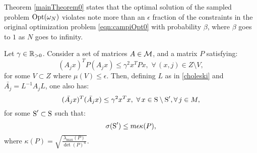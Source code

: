 Theorem \ref{mainTheorem0} states that the optimal solution of the sampled problem $\text{Opt}(\omega_N)$ violates note more than an $\epsilon$ fraction of the constraints in the original optimization problem  \eqref{eqn:campiOpt0} with probability $\beta$, where $\beta$ goes to $1$ as $N$ goes to infinity.


\begin{theorem}\label{thm:mainTheorem01}Let $\gamma \in \mathbb{R}_{> 0}$. Consider a set of matrices $A \in \mathcal{M}$, and a matrix $P$ satisfying:
\begin{equation}\label{eqn:P}(A_j x)^TP(A_j x) \leq {\gamma}^2x^TPx,\,\, \forall\, (x, j) \in Z \setminus V,\end{equation}
for some $V \subset Z$ where $\mu(V) \leq \epsilon$. Then, defining $L$ as in \eqref{choleski} and $\bar{A_j}=  L^{-1}A_jL$, one also has:
\begin{equation*}\label{eqn:thm01-2}(\bar{A_j} x)^T(\bar{A_j} x) \leq {\gamma}^2x^Tx,\,\, \forall\, x \in \text{S} \setminus \text{S}', \forall\, j \in M,\end{equation*}
for some $\text{S}' \subset \text{S}$ such that: $$\sigma(\text{S}') \leq m\epsilon \kappa(P),$$
where $\kappa(P) = \sqrt{\frac{\lambda_{\max}(P)}{\det(P)^n}}$.
\end{theorem}

